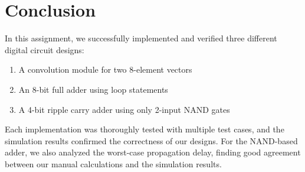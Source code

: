 \documentclass{article}
\begin{document}
\section{Conclusion}

In this assignment, we successfully implemented and verified three different digital circuit designs:

\begin{enumerate}
	\item A convolution module for two 8-element vectors
	\item An 8-bit full adder using loop statements
	\item A 4-bit ripple carry adder using only 2-input NAND gates
\end{enumerate}

Each implementation was thoroughly tested with multiple test cases, and the simulation results confirmed the correctness of our designs. For the NAND-based adder, we also analyzed the worst-case propagation delay, finding good agreement between our manual calculations and the simulation results.
\end{document}
